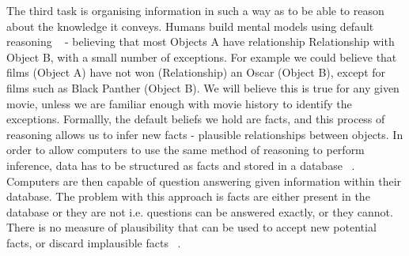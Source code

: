 The third task is organising information in such a way as to be able to reason about the knowledge it conveys. Humans build mental models using default reasoning ~\citep{reiter1980logic} - believing that most Objects A have relationship Relationship with Object B, with a small number of exceptions. For example we could believe that films (Object A) have not won (Relationship) an Oscar (Object B), except for films such as Black Panther (Object B). We will believe this is true for any given movie, unless we are familiar enough with movie history to identify the exceptions. Formallly, the default beliefs we hold are facts, and this process of reasoning allows us to infer new facts - plausible relationships between objects. In order to allow computers to use the same method of reasoning to perform inference, data has to be structured as facts and stored in a database ~\citep{angeli2013philosophers}. Computers are then capable of question answering given information within their database. The problem with this approach is facts are either present in the database or they are not i.e. questions can be answered exactly, or they cannot. There is no measure of plausibility that can be used to accept new potential facts, or discard implausible facts ~\citep{koller2007introduction}.  


\nomenclature[g-p]{$\pi$}{ $\simeq 3.14\ldots$}                                             %



